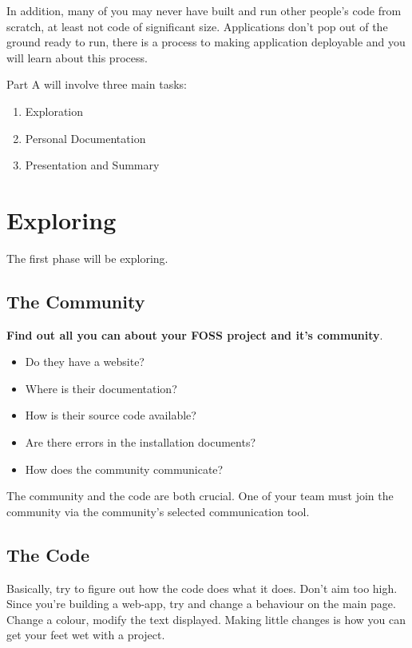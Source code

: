 \documentclass[letterpaper]{article}
\begin{document}
In addition, many of you may never have built and run other people's code from
scratch, at least not code of significant size.  Applications don't pop out of
the ground ready to run, there is a process to making application deployable 
and you will learn about this process.

Part A will involve three main tasks:

\begin{enumerate}
\item Exploration 
\item Personal Documentation
\item Presentation and Summary
\end{enumerate}

\section*{Exploring}

The first phase will be exploring.  

\subsection*{The Community}

{\bf Find out all you can about your FOSS project and it's community}.  

\begin{itemize}
  \item Do they have a website?
  \item Where is their documentation?  
  \item How is their source code available?  
  \item Are there errors in the installation documents?
  \item How does the community communicate?
\end{itemize}

The community and the code are both crucial.  One of your team must join the
community via the community's selected communication tool.

\subsection*{The Code}

Basically, try to figure out how the code
does what it does.  Don't aim too high.  Since you're building a web-app, try
and change a behaviour on the main page.  Change a colour, modify the text
displayed.  Making little changes is how you can get your feet wet with
a project.  
\end{document}
